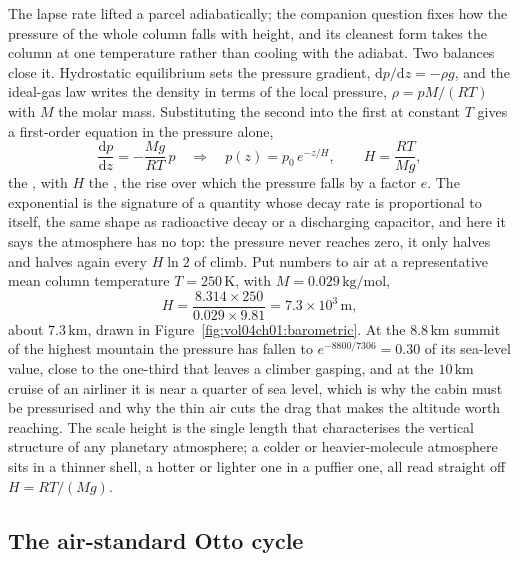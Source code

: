 The lapse rate lifted a parcel adiabatically; the companion question fixes how
the pressure of the whole column falls with height, and its cleanest form takes
the column at one temperature rather than cooling with the adiabat. Two balances
close it. Hydrostatic equilibrium sets the pressure gradient, $\mathrm{d}p/
\mathrm{d}z = -\rho g$, and the ideal-gas law writes the density in terms of the
local pressure, $\rho = pM/(RT)$ with $M$ the molar mass. Substituting the
second into the first at constant $T$ gives a first-order equation in the
pressure alone,
\[
\frac{\mathrm{d}p}{\mathrm{d}z} = -\frac{Mg}{RT}\,p
\quad\Longrightarrow\quad
p(z) = p_0\,e^{-z/H}, \qquad H = \frac{RT}{Mg},
\]
the , with $H$ the , the rise
over which the pressure falls by a factor $e$. The exponential is the signature
of a quantity whose decay rate is proportional to itself, the same shape as
radioactive decay or a discharging capacitor, and here it says the atmosphere
has no top: the pressure never reaches zero, it only halves and halves again
every $H\ln 2$ of climb. Put numbers to air at a representative mean column
temperature $T = 250\,\si{\kelvin}$, with $M = 0.029\,\text{kg}/\text{mol}$,
\[
H = \frac{8.314 \times 250}{0.029 \times 9.81} = 7.3\times 10^{3}\,\text{m},
\]
about $7.3\,\text{km}$, drawn in Figure~\ref{fig:vol04ch01:barometric}. At the
$8.8\,\text{km}$ summit of the highest mountain the pressure has fallen to
$e^{-8800/7306} = 0.30$ of its sea-level value, close to the one-third that
leaves a climber gasping, and at the $10\,\text{km}$ cruise of an airliner it is
near a quarter of sea level, which is why the cabin must be pressurised and why
the thin air cuts the drag that makes the altitude worth reaching. The scale
height is the single length that characterises the vertical structure of any
planetary atmosphere; a colder or heavier-molecule atmosphere sits in a thinner
shell, a hotter or lighter one in a puffier one, all read straight off
$H = RT/(Mg)$.



\subsection{The air-standard Otto cycle}

